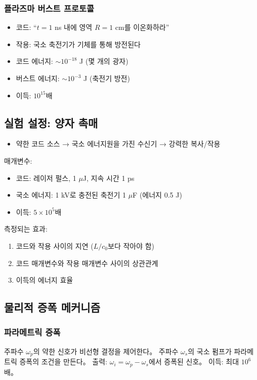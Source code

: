 \documentclass[11pt,a4paper]{article}
\begin{document}
\subsubsection{플라즈마 버스트 프로토콜}
\begin{itemize}
\item 코드: ``$t=1$ ns 내에 영역 $R=1$ cm를 이온화하라''
\item 작용: 국소 축전기가 기체를 통해 방전된다
\item 코드 에너지: $\sim 10^{-18}$ J (몇 개의 광자)
\item 버스트 에너지: $\sim 10^{-3}$ J (축전기 방전)
\item 이득: $10^{15}$배
\end{itemize}

\subsection{실험 설정: 양자 촉매}

\begin{itemize}
\item 약한 코드 소스 → 국소 에너지원을 가진 수신기 → 강력한 복사/작용
\end{itemize}

매개변수:
\begin{itemize}
\item 코드: 레이저 펄스, 1 $\mu$J, 지속 시간 1 ps
\item 국소 에너지: 1 kV로 충전된 축전기 1 $\mu$F (에너지 0.5 J)
\item 이득: $5 \times 10^5$배
\end{itemize}

측정되는 효과:
\begin{enumerate}
\item 코드와 작용 사이의 지연 ($L/c_0$보다 작아야 함)
\item 코드 매개변수와 작용 매개변수 사이의 상관관계
\item 이득의 에너지 효율
\end{enumerate}

\subsection{물리적 증폭 메커니즘}

\subsubsection{파라메트릭 증폭}
주파수 $\omega_p$의 약한 신호가 비선형 결정을 제어한다。 주파수 $\omega_s$의 국소 펌프가 파라메트릭 증폭의 조건을 만든다。 출력: $\omega_i = \omega_p - \omega_s$에서 증폭된 신호。 이득: 최대 $10^6$배。
\end{document}
